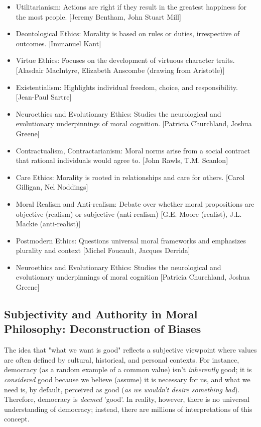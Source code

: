 \documentclass[11pt,a4]{article}
\begin{document}
        \begin{itemize}
            \item Utilitarianism: Actions are right if they result in the
            greatest happiness for the most people. [Jeremy Bentham, John Stuart Mill]

            \item Deontological Ethics: Morality is based on rules or duties, irrespective of outcomes. [Immanuel Kant]
            \item Virtue Ethics: Focuses on the development of virtuous character traits. [Alasdair MacIntyre, Elizabeth Anscombe (drawing from Aristotle)]
            \item Existentialism: Highlights individual freedom, choice, and responsibility. [Jean-Paul Sartre]
            \item Neuroethics and Evolutionary Ethics:  Studies the neurological and evolutionary underpinnings of moral cognition. [Patricia Churchland, Joshua Greene]
            \item Contractualism, Contractarianism: Moral norms arise from a social contract that rational individuals
                  would agree to. [John Rawls, T.M. Scanlon]


            \item Care Ethics: Morality is rooted in relationships and care for others.
                [Carol Gilligan, Nel Noddings]

            \item Moral Realism and Anti-realism:
                 Debate over whether moral propositions are objective (realism)
                or subjective (anti-realism)
                [G.E. Moore (realist), J.L. Mackie (anti-realist)]

            \item Postmodern Ethics:
                 Questions universal moral frameworks and emphasizes plurality and context
                [Michel Foucault, Jacques Derrida]

            \item Neuroethics and Evolutionary Ethics:
                Studies the neurological and evolutionary underpinnings of moral cognition
                [Patricia Churchland, Joshua Greene]


        \end{itemize}

\subsection{Subjectivity and Authority in Moral Philosophy: Deconstruction of Biases}
    The idea that "what we want is good" reflects a subjective viewpoint
    where values are often defined by cultural, historical, and personal
    contexts. For instance, democracy (as a random example of a common value) isn't \textit{inherently} good; it is \textit{considered} good because we
    believe (assume) it is necessary for us, and what we need is, by
    default, perceived as good (\textit{as we wouldn't desire something
    bad}). Therefore, democracy is \textit{deemed} 'good'. In reality,
    however, there is no universal understanding of democracy;
    instead, there are millions of interpretations of this concept.
\end{document}
